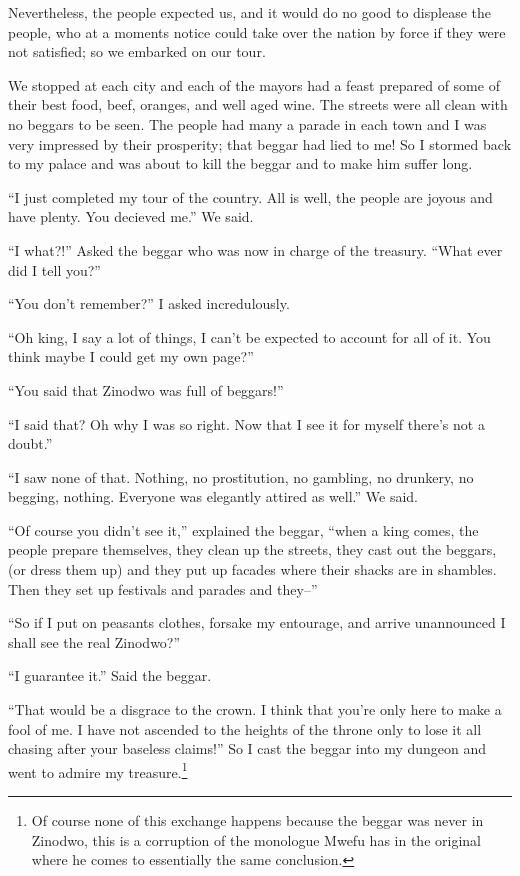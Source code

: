 Nevertheless, the people expected us, and it would do no good to displease the people, who at a moments notice could take over the nation by force if they were not satisfied; so we embarked on our tour. 

We stopped at each city and each of the mayors had a feast prepared of some of their best food, beef, oranges, and well aged wine. The streets were all clean with no beggars to be seen. The people had many a parade in each town and I was very impressed by their prosperity; that beggar had lied to me! So I stormed back to my palace and was about to kill the beggar and to make him suffer long.

``I just completed my tour of the country. All is well, the people are joyous and have plenty. You decieved me.'' We said.

``I what?!'' Asked the beggar who was now in charge of the treasury. ``What ever did I tell you?''

``You don't remember?'' I asked incredulously.

``Oh king, I say a lot of things, I can't be expected to account for all of it. You think maybe I could get my own page?''

``You said that Zinodwo was full of beggars!''

``I said that? Oh why I was so right. Now that I see it for myself there's not a doubt.''

``I saw none of that. Nothing, no prostitution, no gambling, no drunkery, no begging, nothing. Everyone was elegantly attired as well.'' We said.

``Of course you didn't see it,'' explained the beggar, ``when a king comes, the people prepare themselves, they clean up the streets, they cast out the beggars, (or dress them up) and they put up facades where their shacks are in shambles. Then they set up festivals and parades and they--''

``So if I put on peasants clothes, forsake my entourage, and arrive unannounced I shall see the real Zinodwo?''

``I guarantee it.'' Said the beggar.

``That would be a disgrace to the crown. I think that you're only here to make a fool of me. I have not ascended to the heights of the throne only to lose it all chasing after your baseless claims!'' So I cast the beggar into my dungeon and went to admire my treasure.\footnote{Of course none of this exchange happens because the beggar was never in Zinodwo, this is a corruption of the monologue Mwefu has in the original where he comes to essentially the same conclusion.}


